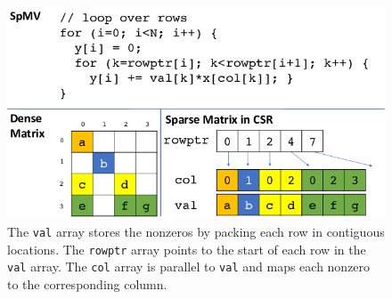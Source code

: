 \begin{figure}[h!]
    \centering
    \includegraphics[width=\linewidth]{figures/Compressed-Sparse-Row-CSR-sparse-matrix-format-The-val-array-stores-the-nonzeros-by.png}
    \caption{The \texttt{val} array stores the nonzeros by packing each row in contiguous locations. The \texttt{rowptr} array points to the start of each row in the \texttt{val} array. The \texttt{col} array is parallel to \texttt{val} and maps each nonzero to the corresponding column.\citep{mohammadi2018sparse}}
    \label{fig:csr}
\end{figure}



